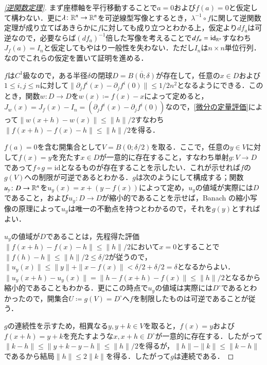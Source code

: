 \begin{proof}[\cref{逆関数定理}]
まず座標軸を平行移動することで$a=0$および$f(a)=0$と仮定して構わない．更に$\lambda \colon \mathbb{R}^n \to \mathbb{R}^n$を可逆線型写像とするとき，$\lambda^{-1} \circ f$に関して逆関数定理が成り立てばあきらかに$f$に対しても成り立つとわかる上，仮定より$df_a$は可逆なので，必要ならば$(df_a)^{-1}$倍した写像を考えることで$df_a = \mathrm{id}_{\mathbb{R}^n}$すなわち$J_f(a) = I_n$と仮定してもやはり一般性を失わない．ただし$I_n$は$n \times n$単位行列．なのでこれらの仮定を置いて証明を進める．

$f$は$C^1$級なので，ある半径$\delta$の閉球$D=\overline{B(0;\delta)}$が存在して，任意の$x \in D$および$1 \leq i,j \leq n$に対して$\|\partial_j f^i(x) - \partial_j f^i(0)\| \leq 1/2n^2$となるようにできる．このとき，関数$w \colon D \to D$を$w(x) \coloneqq f(x) - x$によって定めると，$J_w(x) = J_f(x) - I_n = (\partial_jf^i(x) - \partial_jf^i(0))$なので，\cref{微分の定量評価}によって$\|w(x+h) - w(x)\| \leq \|h\|/2$すなわち$\|f(x+h) - f(x) - h\| \leq \|h\|/2$を得る．

$f(a)=0$を含む開集合として$V = B(0;\delta/2)$を取る．ここで，任意の$y \in V$に対して$f(x) = y$を充たす$x \in D$が一意的に存在すること，すなわち単射$g \colon V \to D$であって$f \circ g = \mathrm{id}$となるものが存在することを示したい．これが示せれば$f$の$g(V)$への制限が可逆であるとわかる．$g$は次のようにして構成する；関数$u_y\colon D \to \mathbb{R}^n$を$u_y(x) = x + (y-f(x))$によって定め，$u_y$の値域が実際には$D$であること，および$u_y \colon D \to D$が縮小的であることを示せば，Banach の縮小写像の原理によって$u_y$は唯一の不動点を持つとわかるので，それを$g(y)$とすればよい．

$u_y$の値域が$D$であることは，先程得た評価$\|f(x+h) - f(x) - h\| \leq \|h\|/2$において$x=0$とすることで$\|f(h)-h\| \leq \|h\|/2 \leq \delta/2$が従うので，$\|u_y(x)\| \leq \|y\|+ \|x-f(x)\| < \delta/2 + \delta/2 = \delta$となるからよい．$\|u_y(x+h)-u_y(x)\| = \|h -f(x+h) - f(x)\| \leq \|h\|/2$となるから縮小的であることもわかる．更にこの時点で$u_y$の値域は実際には$D^\circ$であるとわかったので，開集合$U \coloneqq g(V) = D^\circ$へ$f$を制限したものは可逆であることが従う．

$g$の連続性を示すため，相異なる$y, y+k \in V$を取ると，$f(x) = y$および$f(x+h) = y+k$を充たすような$x, x+h \in D^\circ$が一意的に存在する．したがって$\|k-h\| \leq \|y+k -y -h \| \leq \|h\|/2$を得るが，$\|h\|- \|k\| \leq \|k -h \|$であるから結局$\|h\| \leq 2\|k\|$を得る．したがって$g$は連続である．


\end{proof}
